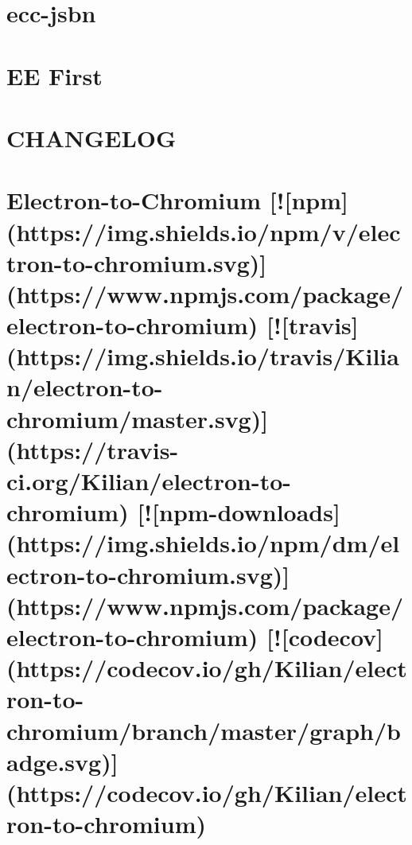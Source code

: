 \documentclass[twoside]{book}
\newcommand{\+}{\discretionary{\mbox{\scriptsize$\hookleftarrow$}}{}{}}
\begin{document}
\chapter{ecc-\/jsbn}
\label{md__c_1_workspace_demo_src_main_script_node_modules_ecc-jsbn__r_e_a_d_m_e}

\chapter{EE First}
\label{md__c_1_workspace_demo_src_main_script_node_modules_ee-first__r_e_a_d_m_e}

\chapter{C\+H\+A\+N\+G\+E\+L\+OG}
\label{md__c_1_workspace_demo_src_main_script_node_modules_electron-to-chromium__c_h_a_n_g_e_l_o_g}

\chapter{Electron-\/to-\/\+Chromium \mbox{[}!\mbox{[}npm\mbox{]}(https\+://img.shields.\+io/npm/v/electron-\/to-\/chromium.svg)\mbox{]}(https\+://www.npmjs.\+com/package/electron-\/to-\/chromium) \mbox{[}!\mbox{[}travis\mbox{]}(https\+://img.shields.\+io/travis/\+Kilian/electron-\/to-\/chromium/master.svg)\mbox{]}(https\+://travis-\/ci.org/\+Kilian/electron-\/to-\/chromium) \mbox{[}!\mbox{[}npm-\/downloads\mbox{]}(https\+://img.shields.\+io/npm/dm/electron-\/to-\/chromium.svg)\mbox{]}(https\+://www.npmjs.\+com/package/electron-\/to-\/chromium) \mbox{[}!\mbox{[}codecov\mbox{]}(https\+://codecov.io/gh/\+Kilian/electron-\/to-\/chromium/branch/master/graph/badge.svg)\mbox{]}(https\+://codecov.io/gh/\+Kilian/electron-\/to-\/chromium)}
\label{md__c_1_workspace_demo_src_main_script_node_modules_electron-to-chromium__r_e_a_d_m_e}

\end{document}
